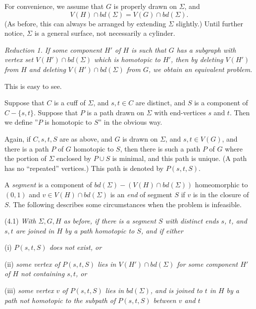 For convenience, we assume that $G$ is properly drawn on $\Sigma$, and
\begin{equation*}
V(H) \cap bd(\Sigma) = V(G) \cap bd(\Sigma).
\end{equation*}
(As before, this can always be arranged by extending $\Sigma$ slightly.) Until further notice, $\Sigma$ is a general surface, not necessarily a cylinder.

\textit{Reduction 1. If some component $H'$ of $H$ is such that $G$ has a subgraph with vertex set $V(H') \cap bd(\Sigma)$ which is homotopic to $H'$, then by deleting $V(H')$ from $H$ and deleting $V(H') \cap bd(\Sigma)$ from $G$, we obtain an equivalent problem.}

This is easy to see.

Suppose that $C$ is a cuff of $\Sigma$, and $s, t \in C$ are distinct, and $S$ is a component of $C - \{s, t\}$. Suppose that $P$ is a path drawn on $\Sigma$ with end-vertices $s$ and $t$. Then we define ''$P$ is homotopic to $S$'' in the obvious way.

Again, if $C, s, t, S$ are as above, and $G$ is drawn on $\Sigma$, and $s, t \in V(G)$, and there is a path $P$ of $G$ homotopic to $S$, then there is such a path $P$ of $G$ where the portion of $\Sigma$ enclosed by $P \cup S$ is minimal, and this path is unique. (A path has no ``repeated'' vertices.) This path is denoted by $P(s, t, S)$.

A \textit{segment} is a component of $bd(\Sigma) - (V(H) \cap bd(\Sigma))$ homeomorphic to $(0, 1)$ and $v \in V(H) \cap bd(\Sigma)$ is an \textit{end} of segment $S$ if $v$ is in the closure of $S$. The following describes some circumstances when the problem is infeasible.

\stmt
(4.1) \textit{With $\Sigma, G, H$ as before, if there is a segment $S$ with distinct ends $s$, $t$, and $s, t$ are joined in $H$ by a path homotopic to $S$, and if either}

\hspace*{12pt}(i) \textit{$P(s, t, S)$ does not exist, or}

\hspace*{12pt}(ii) \textit{some vertex of $P(s, t, S)$ lies in $V(H') \cap bd(\Sigma)$ for some component $H'$ of $H$ not containing $s, t$, or}

\hspace*{12pt}(iii) \textit{some vertex $v$ of $P(s, t, S)$ lies in $bd(\Sigma)$, and is joined to $t$ in $H$ by a path not homotopic to the subpath of $P(s, t, S)$ between $v$ and $t$}

